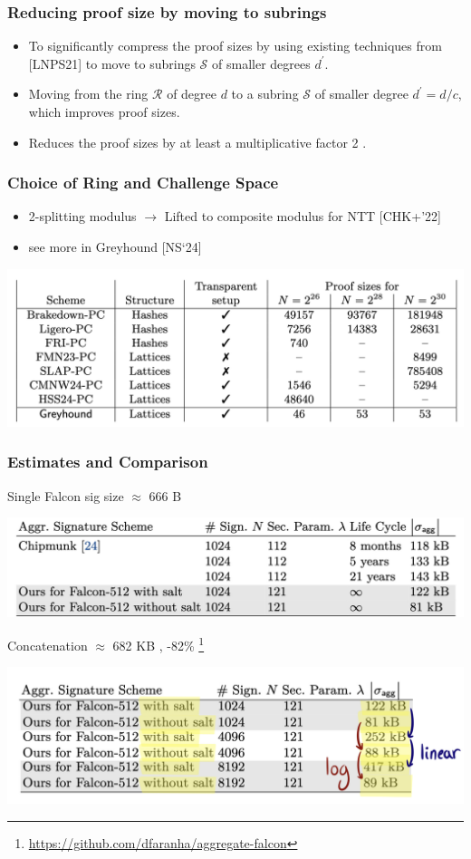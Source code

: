 \documentclass{beamer}
\begin{document}
\begin{frame}
	\frametitle{Reducing proof size by moving to subrings}
	
	\begin{itemize}
		\item To significantly compress the proof sizes by using existing techniques from [LNPS21] to move to subrings $\mathcal{S}$ of smaller degrees $d^{\prime}$.
		\item Moving from the ring $\mathcal{R}$ of degree $d$ to a subring $\mathcal{S}$ of smaller degree $d^{\prime}=d / c$, which improves proof sizes.
		\item Reduces the proof sizes by at least a multiplicative factor 2 .
	\end{itemize}
\end{frame}

\begin{frame}
\frametitle{Choice of Ring and Challenge Space}

\begin{itemize}
	\item 2-splitting modulus $\rightarrow$ Lifted to composite modulus for NTT [CHK+'22]
	\item see more in Greyhound [NS`24]
\end{itemize}
	
\includegraphics[scale=0.3]{greyhound.png}
\end{frame}

\begin{frame}
\frametitle{Estimates and Comparison}

Single Falcon sig size $\approx$ 666 B


\includegraphics[scale=0.25]{size.png}

Concatenation $\approx$ 682 KB  , -82\% \footnote{\url{https://github.com/dfaranha/aggregate-falcon}}

\includegraphics[scale=0.4]{size2.png}

\end{frame}
\end{document}
